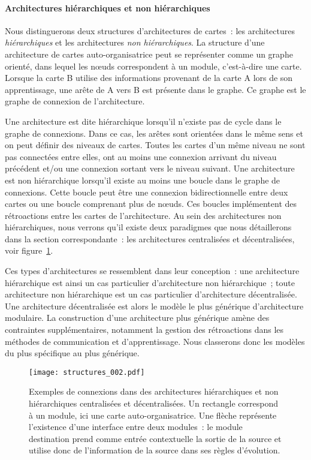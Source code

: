 \documentclass[../main]{subfiles}
\begin{document}
\paragraph{Architectures hiérarchiques et non hiérarchiques}

Nous distinguerons deux structures d'architectures de cartes~: les architectures \emph{hiérarchiques} et les architectures \emph{non hiérarchiques}.
La structure d'une architecture de cartes auto-organisatrice peut se représenter comme un graphe orienté, dans lequel les n\oe{}uds correspondent à un module, c'est-à-dire une carte. Lorsque la carte B utilise des informations provenant de la carte A lors de son apprentissage, une arête de A vers B est présente dans le graphe. Ce graphe est le graphe de connexion de l'architecture.

Une architecture est dite hiérarchique lorsqu'il n'existe pas de cycle dans le graphe de connexions. Dans ce cas, les arêtes sont orientées dans le même sens et on peut définir des niveaux de cartes. Toutes les cartes d'un même niveau ne sont pas connectées entre elles, ont au moins une connexion arrivant du niveau précédent et/ou une connexion sortant vers le niveau suivant.
Une architecture est non hiérarchique lorsqu'il existe au moins une boucle dans le graphe de connexions. Cette boucle peut être une connexion bidirectionnelle entre deux cartes ou une boucle comprenant plus de n\oe{}uds. Ces boucles implémentent des rétroactions entre les cartes de l'architecture.
Au sein des architectures non hiérarchiques, nous verrons qu'il existe deux paradigmes que nous détaillerons dans la section correspondante~: les architectures centralisées et décentralisées, voir figure~\ref{fig:structure}.


Ces types d'architectures se ressemblent dans leur conception~: une architecture hiérarchique est ainsi un cas particulier d'architecture non hiérarchique~; toute architecture non hiérarchique est un cas particulier d'architecture décentralisée. Une architecture décentralisée est alors le modèle le plus générique d'architecture modulaire.
La construction d'une architecture plus générique amène des contraintes supplémentaires, notamment la gestion des rétroactions dans les méthodes de communication et d'apprentissage.
Nous classerons donc les modèles du plus spécifique au plus générique.
\begin{figure}
    \centering\texttt{[image: structures\_002.pdf]}
    \caption{Exemples de connexions dans des architectures hiérarchiques et non hiérarchiques centralisées et décentralisées. Un rectangle correspond à un module, ici une carte auto-organisatrice. Une flèche représente l'existence d'une interface entre deux modules~: le module destination prend comme entrée contextuelle la sortie de la source et utilise donc de l'information de la source dans ses règles d'évolution. \label{fig:structure}}
    \end{figure}
\end{document}

